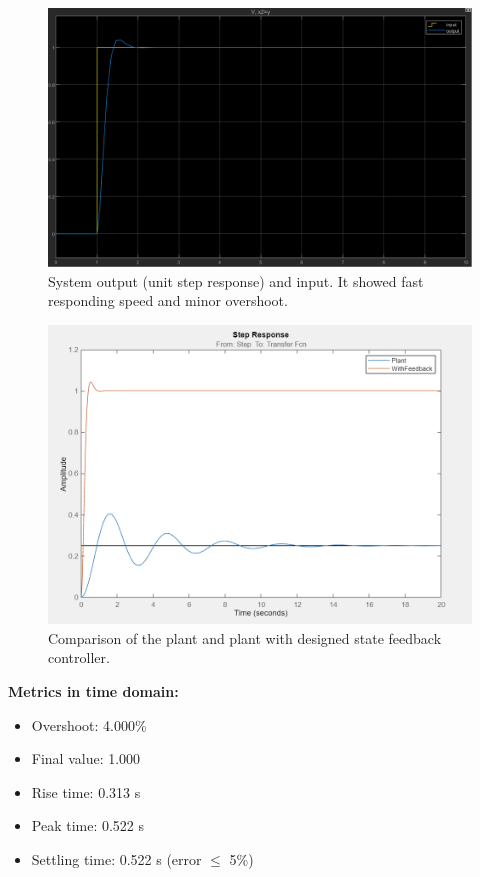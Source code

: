 \documentclass[12pt, oneside]{article}
\begin{document}
\begin{figure}[htbp]
    \centering
    \includegraphics[width = \linewidth]{Report/pics/OutputResult1.png}
    \caption{System output (unit step response) and input. It showed fast responding speed and minor overshoot.}
    \label{fig:OutputResult1}
\end{figure}

\begin{figure}[htbp]
    \centering
    \includegraphics[width=\linewidth]{Report/pics/Compare.png}
    \caption{Comparison of the plant and plant with designed state feedback controller.}
    \label{fig:my_label}
\end{figure}


\FloatBarrier

\textbf{Metrics in time domain:}
\begin{itemize}
            \item Overshoot: 4.000\%
            \item Final value: 1.000
            \item Rise time: 0.313 s
            \item Peak time: 0.522 s
            \item Settling time: 0.522 s (error $\leq$ 5\%)
\end{itemize}
        
\end{document}
